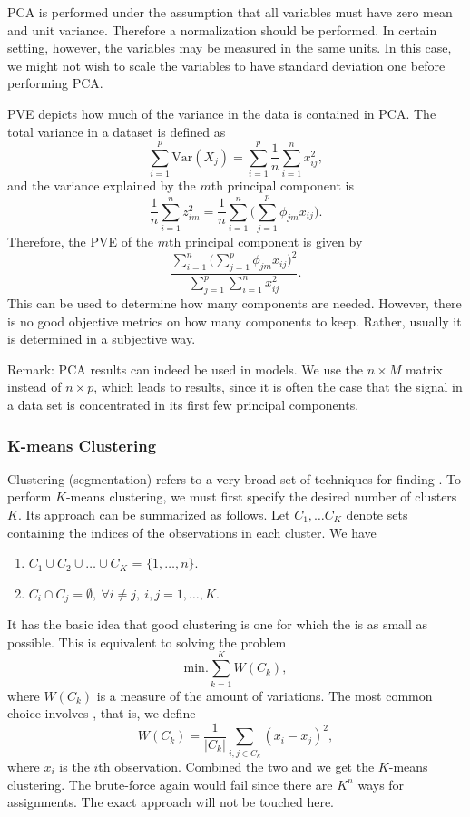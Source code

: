 PCA is performed under the assumption that all variables must have zero mean and unit variance. Therefore a normalization should be performed. In certain setting, however, the variables may be measured in the same units. In this case, we might not wish to scale the variables to have standard deviation one before performing PCA. 


PVE depicts how much of the variance in the data is contained in PCA. The total variance in a dataset is defined as $$ \sum_{i=1}^{p}\text{Var}(X_j) = \sum_{i=1}^{p}\frac{1}{n}\sum_{i=1}^{n}x_{ij}^2,$$ and the variance explained by the $m$th principal component is $$ \frac{1}{n}\sum_{i=1}^{n}z_{im}^2 = \frac{1}{n}\sum_{i=1}^{n}\bigg(\sum_{j=1}^{p}\phi_{jm}x_{ij}\bigg).$$ Therefore, the PVE of the $m$th principal component is given by $$ \frac{\sum_{i=1}^n \big(\sum_{j=1}^p\phi_{jm}x_{ij}\big)^2}{\sum_{j=1}^p\sum_{i=1}^n x_{ij}^2}.$$ This can be used to determine how many components are needed. However, there is no good objective metrics on how many components to keep. Rather, usually it is determined in a subjective way.
\begin{tbox}
Remark: PCA results can indeed be used in models. We use the $n \times M$ matrix instead of $n \times p$, which leads to  results, since it is often the case that the signal in a data set is concentrated in its first few principal components.
\end{tbox}

\subsubsection{K-means Clustering}
Clustering (segmentation) refers to a very broad set of techniques for finding . To perform $K$-means clustering, we must first specify the desired number of clusters $K$. Its approach can be summarized as follows. Let $C_1, \dots C_K$ denote sets containing the indices of the observations in each cluster. We have
\begin{enumerate}
	\item $C_1 \cup C_2 \cup \dots \cup C_K$ = $\{1,\dots,n\}$. 
	\item $C_i \cap C_j = \emptyset,\ \forall i \neq j,\ i,j = 1,\dots,K$.
\end{enumerate}
It has the basic idea that good clustering is one for which the  is as small as possible. This is equivalent to solving the problem $$ \text{min.} \sum_{k=1}^{K} W(C_k),$$ where $W(C_k)$ is a measure of the amount of variations. The most common choice involves , that is, we define $$ W(C_k) = \frac{1}{|C_k|} \sum_{i, j \in C_k}(x_i - x_j)^2, $$ where $x_i$ is the $i$th observation.  Combined the two and we get the $K$-means clustering. The brute-force again would fail since there are $K^n$ ways for assignments. The exact approach will not be touched here.


